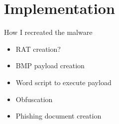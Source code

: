 \chapter{Implementation}
How I recreated the malware
\begin{itemize}
  \item RAT creation?
  \item BMP payload creation
  \item Word script to execute payload
  \item Obfuscation
  \item Phishing document creation
\end{itemize}

